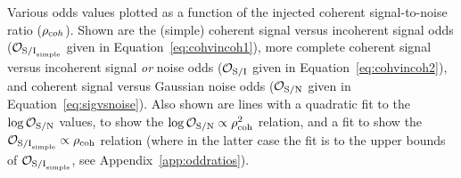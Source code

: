 \label{fig:snrvsodds}
Various odds values plotted as a function of the injected coherent signal-to-noise ratio ($\rho_{\text coh}$).
Shown are the (simple) coherent signal versus incoherent signal odds ($\mathcal{O}_{{\rm S/I}_{\rm simple}}$ given
in Equation~\ref{eq:cohvincoh1}), more complete coherent signal versus incoherent signal {\it or} noise odds
($\mathcal{O}_{\rm S/I}$ given in Equation~\ref{eq:cohvincoh2}), and coherent signal versus Gaussian noise odds
($\mathcal{O}_{\rm S/N}$ given in Equation~\ref{eq:sigvsnoise}). Also shown are lines with a quadratic fit
to the $\log{\mathcal{O}_{\rm S/N}}$ values, to show the $\log{\mathcal{O}_{\rm S/N}} \propto \rho_{\text{coh}}^2$ relation,
and a fit to show the $\mathcal{O}_{{\rm S/I}_{\rm simple}} \propto \rho_{\text{coh}}$ relation (where in the latter case
the fit is to the upper bounds of $\mathcal{O}_{{\rm S/I}_{\rm simple}}$, see Appendix~\ref{app:oddratios}). 
